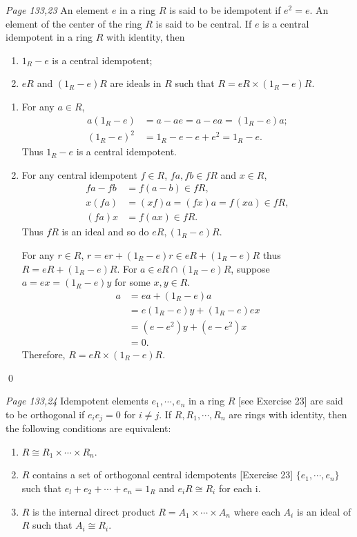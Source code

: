 \begin{enumerate}
\newpage
\prob\textit{Page 133,23}
An element $e$ in a ring $R$ is said to be idempotent if $e^2 = e$. 
An element of the center of the ring $R$ is said to be central. 
If $e$ is a central idempotent in a ring $R$ with identity, then
\begin{enumerate}
	\item $1_R - e$ is a central idempotent;
	\item $eR$ and $(1_R - e)R$ are ideals in $R$ such that $R = eR \times (1_R - e)R$.
\end{enumerate}
\soln
\begin{enumerate}
	\item For any $a\in R$, 
	\begin{align*}
		a(1_R-e) & = a-ae =a-ea =(1_R-e)a; \\
		(1_R-e)^2 & = 1_R-e-e+e^2 =1_R-e.
	\end{align*}
	Thus $1_R - e$ is a central idempotent.
	\item For any central idempotent $f\in R$, $fa,fb \in fR$ and $x \in R$, \begin{align*}
		fa-fb & = f(a-b) \in fR, \\
		x(fa) & = (xf)a =(fx)a=f(xa) \in fR, \\
		(fa)x & = f(ax) \in fR. 
	\end{align*}
	Thus $fR$ is an ideal and so do $eR,(1_R - e)R$. 
	
	For any $r\in R$, $r=er+(1_R -e)r\in eR+(1_R -e)R$ thus $R=eR+(1_R -e)R$. 
	For $a\in eR \cap (1_R - e)R$, suppose $a=ex=(1_R -e)y$ for some $x,y\in R$. \begin{align*}
		a &= ea+(1_R -e)a \\
		&= e(1_R -e)y+(1_R -e)ex \\
		&= (e-e^2)y+(e-e^2)x \\
		&= 0.
	\end{align*}
	Therefore, $R = eR \times (1_R - e)R$.
\end{enumerate}\qed

\prob\textit{Page 133,24}
Idempotent elements $e_1, \cdots ,e_n$ in a ring $R$ [see Exercise 23] are said to be orthogonal if $e_ie_j = 0$ for $i \neq j$. If $R, R_1, \cdots, R_n$ are rings with identity, then the following conditions are equivalent:
\begin{enumerate}
	\item $R \cong R_1 \times \cdots \times R_n$.
	\item $R$ contains a set of orthogonal central idempotents [Exercise 23] $\{e_1, \cdots , e_n\}$ such that $e_l + e_2 + \cdots + e_n = 1_R$ and $e_iR \cong R_i$ for each i.
	\item $R$ is the internal direct product $R = A_1 \times \cdots \times A_n$ where each $A_i$ is an ideal of $R$ such that $A_i \cong R_i$.


\end{enumerate}
\end{enumerate}
